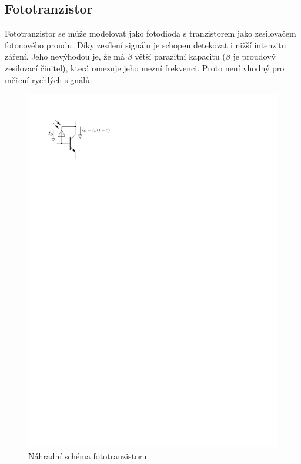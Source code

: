 \subsection{Fototranzistor}
Fototranzistor se může modelovat jako fotodioda s tranzistorem jako zesilovačem fotonového proudu. Díky zesílení signálu je schopen detekovat i nižší intenzitu záření. Jeho nevýhodou je, že má $\beta$ větší parazitní kapacitu ($\beta$ je proudový zesilovací činitel), která omezuje jeho mezní frekvenci. Proto není vhodný pro měření rychlých signálů.

\begin{figure}[H]
    \begin{center}
        \includegraphics[scale=1]{img/foto-tran}
    \end{center}
    \caption{Náhradní schéma fototranzistoru}
\end{figure}

